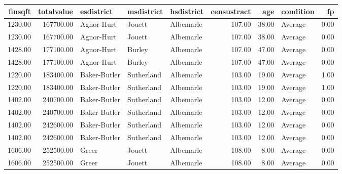 \begin{table}[ht]
\centering
\begin{tabular}{rrlllrrlr}
  \hline
finsqft & totalvalue & esdistrict & msdistrict & hsdistrict & censustract & age & condition & fp \\ 
  \hline
1230.00 & 167700.00 & Agnor-Hurt & Jouett & Albemarle & 107.00 & 38.00 & Average & 0.00 \\ 
  1230.00 & 167700.00 & Agnor-Hurt & Jouett & Albemarle & 107.00 & 38.00 & Average & 0.00 \\ 
  1428.00 & 177100.00 & Agnor-Hurt & Burley & Albemarle & 107.00 & 47.00 & Average & 0.00 \\ 
  1428.00 & 177100.00 & Agnor-Hurt & Burley & Albemarle & 107.00 & 47.00 & Average & 0.00 \\ 
  1220.00 & 183400.00 & Baker-Butler & Sutherland & Albemarle & 103.00 & 19.00 & Average & 1.00 \\ 
  1220.00 & 183400.00 & Baker-Butler & Sutherland & Albemarle & 103.00 & 19.00 & Average & 1.00 \\ 
  1402.00 & 240700.00 & Baker-Butler & Sutherland & Albemarle & 103.00 & 12.00 & Average & 0.00 \\ 
  1402.00 & 240700.00 & Baker-Butler & Sutherland & Albemarle & 103.00 & 12.00 & Average & 0.00 \\ 
  1402.00 & 242600.00 & Baker-Butler & Sutherland & Albemarle & 103.00 & 12.00 & Average & 0.00 \\ 
  1402.00 & 242600.00 & Baker-Butler & Sutherland & Albemarle & 103.00 & 12.00 & Average & 0.00 \\ 
  1606.00 & 252500.00 & Greer & Jouett & Albemarle & 108.00 & 8.00 & Average & 0.00 \\ 
  1606.00 & 252500.00 & Greer & Jouett & Albemarle & 108.00 & 8.00 & Average & 0.00 \\ 
   \hline
\end{tabular}
\end{table}
